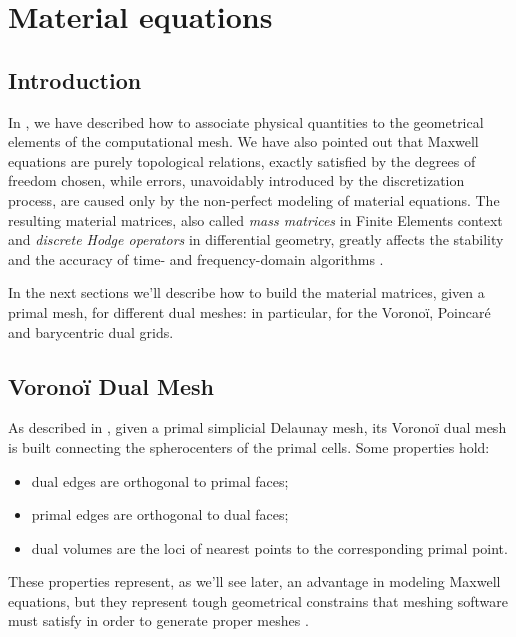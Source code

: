\chapter{Material equations} \label{cha:material_equations}

\section{Introduction}

In , we have described how to
associate physical quantities to the geometrical elements of the
computational mesh. We have also pointed out that Maxwell equations are
purely topological relations, exactly satisfied by the degrees of
freedom chosen, while errors, unavoidably introduced by the
discretization process, are caused only by the non-perfect modeling of
material equations. The resulting material matrices, also called \emph{mass
matrices} in Finite Elements context and \emph{discrete Hodge
operators} in differential geometry, greatly affects the stability and
the accuracy of time- and frequency-domain algorithms
\cite{schuhmann_whitney,schuhmann_stability}.

In the next sections we'll describe how to build the material
matrices, given a primal mesh, for different dual meshes: in
particular, for the Vorono\"i, Poincar\'e and barycentric dual grids.

\section{Vorono\"i Dual Mesh}  \label{sec:voronoi}

As described in , given a primal simplicial Delaunay
mesh, its Vorono\"i dual mesh is built connecting the spherocenters of
the primal cells. Some properties hold:
\begin{itemize}
\item
  dual edges are orthogonal to primal faces;
\item
  primal edges are orthogonal to dual faces;
\item
  dual volumes are the loci of nearest points to the corresponding
  primal point.
\end{itemize}

These properties represent, as we'll see later, an advantage in modeling
Maxwell equations, but they represent tough geometrical
constrains that meshing software must satisfy in order to generate
proper meshes \cite{triangle}.

